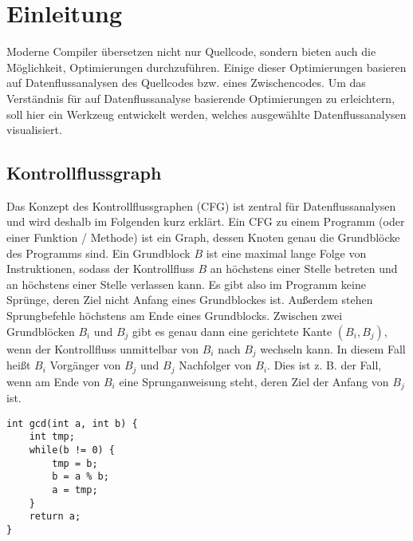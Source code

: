 
\section{Einleitung}

Moderne Compiler übersetzen nicht nur Quellcode, sondern bieten auch die Möglichkeit, Optimierungen durchzuführen. 
Einige dieser Optimierungen basieren auf Datenflussanalysen des Quellcodes bzw. eines Zwischencodes.
Um das Verständnis für auf Datenflussanalyse basierende Optimierungen zu erleichtern, soll hier ein Werkzeug entwickelt werden, welches ausgewählte Datenflussanalysen visualisiert.

\subsection{Kontrollflussgraph}
Das Konzept des Kontrollflussgraphen (CFG) ist zentral für Datenflussanalysen und wird deshalb im Folgenden kurz erklärt.
Ein CFG zu einem Programm (oder einer Funktion / Methode) ist ein Graph, dessen Knoten genau die Grundblöcke des Programms sind.
Ein Grundblock $B$ ist eine maximal lange Folge von Instruktionen, sodass der Kontrollfluss $B$ an höchstens einer Stelle betreten und an höchstens einer Stelle verlassen kann.
Es gibt also im Programm keine Sprünge, deren Ziel nicht Anfang eines Grundblockes ist.
Außerdem stehen Sprungbefehle höchstens am Ende eines Grundblocks.
Zwischen zwei Grundblöcken $B_i$ und $B_j$ gibt es genau dann eine gerichtete Kante $(B_i,B_j)$, wenn der Kontrollfluss unmittelbar von $B_i$ nach $B_j$ wechseln kann.
In diesem Fall heißt $B_i$ Vorgänger von $B_j$ und $B_j$ Nachfolger von $B_i$.
Dies ist z. B. der Fall, wenn am Ende von $B_i$ eine Sprunganweisung steht, deren Ziel der Anfang von $B_j$ ist.

\par

\begin{lstlisting}[frame=single, captionpos=b, caption=Simple Funktion zur Veranschaulichung eines CFG]
int gcd(int a, int b) {
	int tmp;
	while(b != 0) {
		tmp = b;
		b = a % b;
		a = tmp;
	}
	return a;
}
\end{lstlisting}

\par


